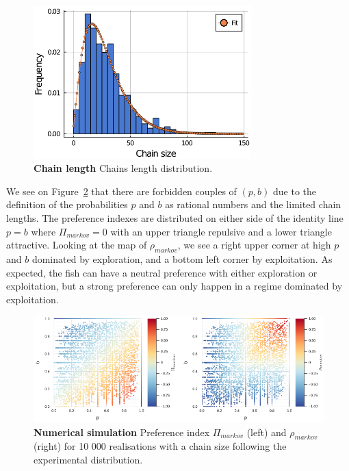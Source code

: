   \begin{figure}[htb]
    \centering
    \includegraphics[width=0.75\textwidth]{part_2/assets/chain_fit.png}
    \caption{\textbf{Chain length} Chains length distribution.}
    \label{chain_fit}
  \end{figure}

  We see on Figure~\ref{markov_simu} that there are forbidden couples of $(p,b)$ due to the definition of the probabilities $p$ and $b$ as rational numbers and the limited chain lengths. The preference indexes are distributed on either side of the identity line $p=b$ where $\Pi_{markov} = 0$ with an upper triangle repulsive and a lower triangle attractive. Looking at the map of $\rho_{markov}$, we see a right upper corner at high $p$ and $b$ dominated by exploration, and a bottom left corner by exploitation. As expected, the fish can have a neutral preference with either exploration or exploitation, but a strong preference can only happen in a regime dominated by exploitation.

  \begin{figure}[htb]
    \centering
    \includegraphics[width=1\textwidth]{part_2/assets/pi_pb.png}
    \caption{\textbf{Numerical simulation} Preference index $\Pi_{markov}$ (left) and $\rho_{markov}$ (right) for 10 000 realisations with a chain size following the experimental distribution.}
    \label{markov_simu}
  \end{figure}


